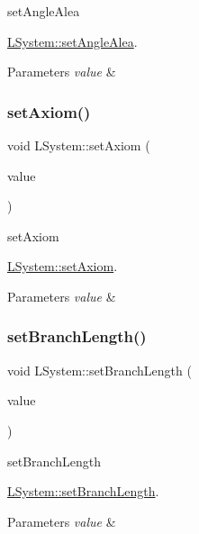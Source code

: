 set\+Angle\+Alea 

\hyperlink{classLSystem_ad05d5d24fdbe1ac6496bf5d9733a4702}{L\+System\+::set\+Angle\+Alea}.


\begin{DoxyParams}{Parameters}
{\em value} & \\
\hline
\end{DoxyParams}
\mbox{\label{classLSystem_a01c83e49821d4d19c83dc7d3bb8da97c}} 
\subsubsection{\texorpdfstring{set\+Axiom()}{setAxiom()}}
{\footnotesize\ttfamily void L\+System\+::set\+Axiom (\begin{DoxyParamCaption}\item[{const Q\+String \&}]{value }\end{DoxyParamCaption})}



set\+Axiom 

\hyperlink{classLSystem_a01c83e49821d4d19c83dc7d3bb8da97c}{L\+System\+::set\+Axiom}.


\begin{DoxyParams}{Parameters}
{\em value} & \\
\hline
\end{DoxyParams}
\mbox{\label{classLSystem_afda7870630630451988aa23d1fee2249}} 
\subsubsection{\texorpdfstring{set\+Branch\+Length()}{setBranchLength()}}
{\footnotesize\ttfamily void L\+System\+::set\+Branch\+Length (\begin{DoxyParamCaption}\item[{float}]{value }\end{DoxyParamCaption})}



set\+Branch\+Length 

\hyperlink{classLSystem_afda7870630630451988aa23d1fee2249}{L\+System\+::set\+Branch\+Length}.


\begin{DoxyParams}{Parameters}
{\em value} & \\
\hline
\end{DoxyParams}
\mbox{\label{classLSystem_ad09d0ac8d510a5aae1cc090a7b6c0266}} 
